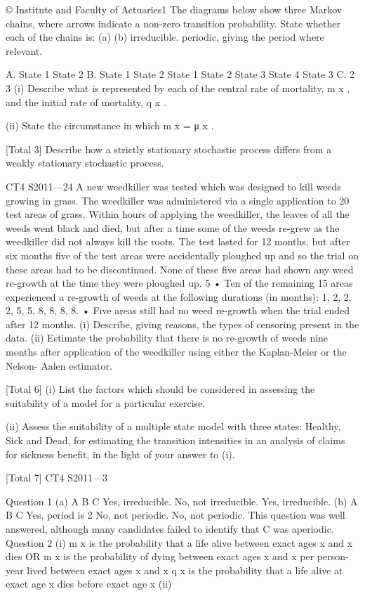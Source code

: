 \documentclass[a4paper,12pt]{article}
\begin{document}
\begin{enumerate}
© Institute and Faculty of Actuaries1
The diagrams below show three Markov chains, where arrows indicate a non-zero
transition probability.
State whether each of the chains is:
(a)
(b)
irreducible.
periodic, giving the period where relevant.

A.
State 1
State 2
B.
State 1 State 2
State 1 State 2
State 3 State 4
State 3
C.
2
3
(i) Describe what is represented by each of the central rate of mortality, m x , and
the initial rate of mortality, q x .

(ii) State the circumstance in which m x = μ x .

[Total 3]
Describe how a strictly stationary stochastic process differs from a weakly stationary
stochastic process.

CT4 S2011—24
A new weedkiller was tested which was designed to kill weeds growing in grass. The
weedkiller was administered via a single application to 20 test areas of grass. Within
hours of applying the weedkiller, the leaves of all the weeds went black and died, but
after a time some of the weeds re-grew as the weedkiller did not always kill the roots.
The test lasted for 12 months, but after six months five of the test areas were
accidentally ploughed up and so the trial on these areas had to be discontinued. None
of these five areas had shown any weed re-growth at the time they were ploughed up.
5
• Ten of the remaining 15 areas experienced a re-growth of weeds at the following
durations (in months): 1, 2, 2, 2, 5, 5, 8, 8, 8, 8.
• Five areas still had no weed re-growth when the trial ended after 12 months.
(i) Describe, giving reasons, the types of censoring present in the data.
(ii) Estimate the probability that there is no re-growth of weeds nine months after application of the weedkiller using either the Kaplan-Meier or the Nelson-
Aalen estimator.

[Total 6]
(i) List the factors which should be considered in assessing the suitability of a
model for a particular exercise.

(ii) Assess the suitability of a multiple state model with three states: Healthy, Sick
and Dead, for estimating the transition intensities in an analysis of claims for
sickness benefit, in the light of your answer to (i).

[Total 7]
CT4 S2011—3

Question 1
(a) A
B
C Yes, irreducible.
No, not irreducible.
Yes, irreducible.
(b) A
B
C Yes, period is 2
No, not periodic.
No, not periodic.
This question was well answered, although many candidates failed to identify that C was
aperiodic.
Question 2
(i)
m x is the probability that a life alive between exact ages x and x dies
OR
m x is the probability of dying between exact ages x and x per person-year lived
between exact ages x and x
q x is the probability that a life alive at exact age x dies before exact age x
(ii)


\end{enumerate}
\end{document}
